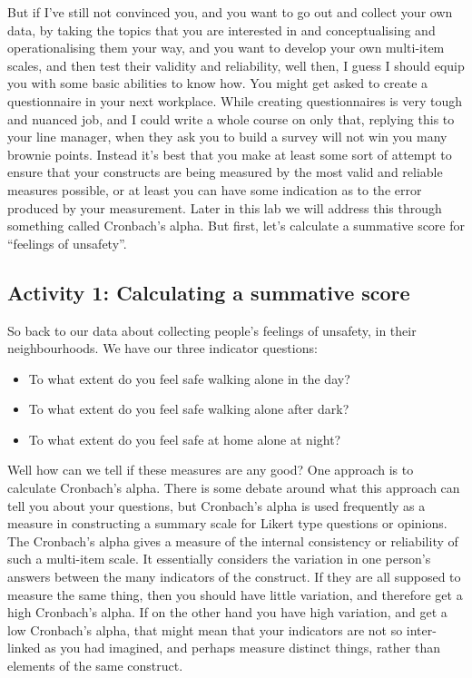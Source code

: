 \documentclass[]{book}
\providecommand{\tightlist}{%
  \setlength{\itemsep}{0pt}\setlength{\parskip}{0pt}}
\theoremstyle{definition}
\theoremstyle{definition}
\theoremstyle{definition}
\theoremstyle{remark}
\begin{document}
But if I've still not convinced you, and you want to go out and collect
your own data, by taking the topics that you are interested in and
conceptualising and operationalising them your way, and you want to
develop your own multi-item scales, and then test their validity and
reliability, well then, I guess I should equip you with some basic
abilities to know how. You might get asked to create a questionnaire in
your next workplace. While creating questionnaires is very tough and
nuanced job, and I could write a whole course on only that, replying
this to your line manager, when they ask you to build a survey will not
win you many brownie points. Instead it's best that you make at least
some sort of attempt to ensure that your constructs are being measured
by the most valid and reliable measures possible, or at least you can
have some indication as to the error produced by your measurement. Later
in this lab we will address this through something called Cronbach's
alpha. But first, let's calculate a summative score for ``feelings of
unsafety''.

\hypertarget{activity-1-calculating-a-summative-score}{%
\subsection{Activity 1: Calculating a summative
score}\label{activity-1-calculating-a-summative-score}}

So back to our data about collecting people's feelings of unsafety, in
their neighbourhoods. We have our three indicator questions:

\begin{itemize}
\tightlist
\item
  To what extent do you feel safe walking alone in the day?
\item
  To what extent do you feel safe walking alone after dark?
\item
  To what extent do you feel safe at home alone at night?
\end{itemize}

Well how can we tell if these measures are any good? One approach is to
calculate Cronbach's alpha. There is some debate around what this
approach can tell you about your questions, but Cronbach's alpha is used
frequently as a measure in constructing a summary scale for Likert type
questions or opinions. The Cronbach's alpha gives a measure of the
internal consistency or reliability of such a multi-item scale. It
essentially considers the variation in one person's answers between the
many indicators of the construct. If they are all supposed to measure
the same thing, then you should have little variation, and therefore get
a high Cronbach's alpha. If on the other hand you have high variation,
and get a low Cronbach's alpha, that might mean that your indicators are
not so inter-linked as you had imagined, and perhaps measure distinct
things, rather than elements of the same construct.
\end{document}
